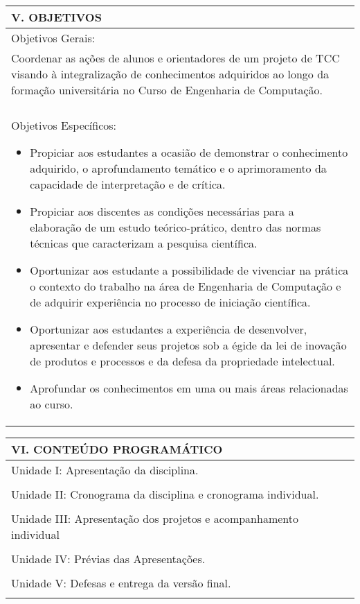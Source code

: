 \documentclass[12pt]{article}
\begin{document}
\begin{longtable}{|L{1.025\textwidth}|} \hline
%
{\bf V. OBJETIVOS } \\ \hline
Objetivos Gerais: \\

Coordenar as ações de alunos e orientadores de um projeto de TCC visando à integralização de conhecimentos adquiridos ao longo da formação universitária no Curso de Engenharia de Computação.\\
\\
Objetivos Específicos: 
\begin{itemize}
\item Propiciar aos estudantes a ocasião de demonstrar o conhecimento adquirido, o aprofundamento temático e o aprimoramento da capacidade de interpretação e de crítica.
\item Propiciar aos discentes as condições necessárias para a elaboração de um estudo teórico-prático, dentro das normas técnicas que caracterizam a pesquisa científica.
\item  Oportunizar aos estudante a possibilidade de vivenciar na prática o contexto do trabalho na área de Engenharia de Computação e de adquirir experiência no processo de iniciação científica.
\item  Oportunizar aos estudantes a experiência de desenvolver, apresentar e defender seus projetos sob a égide da lei de inovação de produtos e processos e da defesa da propriedade intelectual.
\item Aprofundar os conhecimentos em uma ou mais áreas relacionadas ao curso.
\end{itemize}
\\ \hline
\end{longtable}


\begin{longtable}{|L{1.025\textwidth}|} \hline
%
{\bf VI. CONTEÚDO PROGRAMÁTICO } \\ \hline
Unidade I: Apresentação da disciplina.\\
\\
Unidade II: Cronograma da disciplina e cronograma individual.\\
\\
Unidade III: Apresentação dos projetos e acompanhamento individual\\
\\
Unidade IV: Prévias das Apresentações. \\
\\
Unidade V: Defesas e entrega da versão final. \\
\\ \hline
\end{longtable} 
\end{document}
